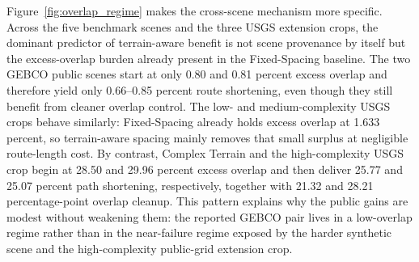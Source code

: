 \documentclass[jmse,article,submit,moreauthors]{Definitions/mdpi}
\begin{document}
Figure~\ref{fig:overlap_regime} makes the cross-scene mechanism more specific. Across the five benchmark scenes and the three USGS extension crops, the dominant predictor of terrain-aware benefit is not scene provenance by itself but the excess-overlap burden already present in the Fixed-Spacing baseline. The two GEBCO public scenes start at only 0.80 and 0.81 percent excess overlap and therefore yield only 0.66--0.85 percent route shortening, even though they still benefit from cleaner overlap control. The low- and medium-complexity USGS crops behave similarly: Fixed-Spacing already holds excess overlap at 1.633 percent, so terrain-aware spacing mainly removes that small surplus at negligible route-length cost. By contrast, Complex Terrain and the high-complexity USGS crop begin at 28.50 and 29.96 percent excess overlap and then deliver 25.77 and 25.07 percent path shortening, respectively, together with 21.32 and 28.21 percentage-point overlap cleanup. This pattern explains why the public gains are modest without weakening them: the reported GEBCO pair lives in a low-overlap regime rather than in the near-failure regime exposed by the harder synthetic scene and the high-complexity public-grid extension crop.
\end{document}

